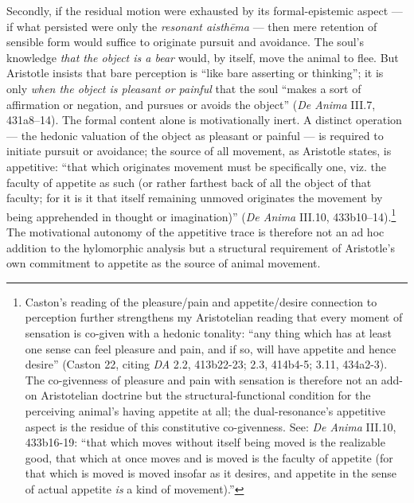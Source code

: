 \documentclass{article}
\begin{document}
Secondly, if the residual motion were exhausted by its formal-epistemic aspect --- if what persisted were only the \textit{resonant aisthēma} --- then mere retention of sensible form would suffice to originate pursuit and avoidance. The soul's knowledge \textit{that the object is a bear} would, by itself, move the animal to flee. But Aristotle insists that bare perception is ``like bare asserting or thinking''; it is only \textit{when the object is pleasant or painful} that the soul ``makes a sort of affirmation or negation, and pursues or avoids the object'' (\textit{De Anima} III.7, 431a8--14). The formal content alone is motivationally inert. A distinct operation --- the hedonic valuation of the object as pleasant or painful --- is required to initiate pursuit or avoidance; the source of all movement, as Aristotle states, is appetitive: ``that which originates movement must be specifically one, viz. the faculty of appetite as such (or rather farthest back of all the object of that faculty; for it is it that itself remaining unmoved originates the movement by being apprehended in thought or imagination)'' (\textit{De Anima} III.10, 433b10--14).\footnote{Caston's reading of the pleasure/pain and appetite/desire connection to perception further strengthens my Aristotelian reading that every moment of sensation is co-given with a hedonic tonality: ``any thing which has at least one sense can feel pleasure and pain, and if so, will have appetite and hence desire'' (Caston 22, citing \textit{DA} 2.2, 413b22-23; 2.3, 414b4-5; 3.11, 434a2-3). The co-givenness of pleasure and pain with sensation is therefore not an add-on Aristotelian doctrine but the structural-functional condition for the perceiving animal's having appetite at all; the dual-resonance's appetitive aspect is the residue of this constitutive co-givenness. See: \textit{De Anima} III.10, 433b16-19: ``that which moves without itself being moved is the realizable good, that which at once moves and is moved is the faculty of appetite (for that which is moved is moved insofar as it desires, and appetite in the sense of actual appetite \textit{is} a kind of movement).''} The motivational autonomy of the appetitive trace is therefore not an ad hoc addition to the hylomorphic analysis but a structural requirement of Aristotle's own commitment to appetite as the source of animal movement.
\end{document}
